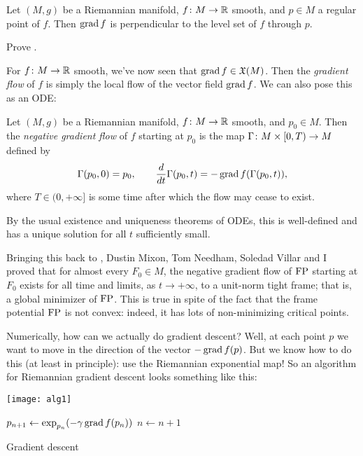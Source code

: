 \begin{proposition}\label{prop:gradient normal to level sets}
	Let $(M,g)$ be a Riemannian manifold, $f \colon\thinspace\! M \to \mathbb{R}$ smooth, and $p \in M$ a regular point of $f$. Then $\operatorname{grad} f$ is perpendicular to the level set of $f$ through $p$.
\end{proposition}

\begin{exercise}
	Prove .
\end{exercise}

For $f \colon\thinspace\! M \to \mathbb{R}$ smooth, we've now seen that $\operatorname{grad} f \in \mathfrak{X}(M)$. Then the \emph{gradient flow} of $f$ is simply the local flow of the vector field $\operatorname{grad} f$. We can also pose this as an ODE:

\begin{definition}\label{def:negative gradient flow}
	Let $(M,g)$ be a Riemannian manifold, $f \colon\thinspace\! M \to \mathbb{R}$ smooth, and $p_0 \in M$. Then the \emph{negative gradient flow} of $f$ starting at $p_0$ is the map $\Gamma \colon\thinspace\! M \times [0,T) \to M$ defined by
	\[
		\Gamma(p_0,0) = p_0, \qquad \frac{d}{dt}\Gamma(p_0,t) = -\operatorname{grad} f(\Gamma(p_0,t)),
	\]
	where $T \in (0,+\infty]$ is some time after which the flow may cease to exist.
\end{definition}
By the usual existence and uniqueness theorems of ODEs, this is well-defined and has a unique solution for all $t$ sufficiently small.

Bringing this back to , Dustin Mixon, Tom Needham, Soledad Villar and I~\cite{mixonThreeProofsBenedetto2023} proved that for almost every $F_0 \in M$, the negative gradient flow of $\operatorname{FP}$ starting at $F_0$ exists for all time and limits, as $t \to +\infty$, to a unit-norm tight frame; that is, a global minimizer of $\operatorname{FP}$. This is true in spite of the fact that the frame potential $\operatorname{FP}$ is not convex: indeed, it has lots of non-minimizing critical points.

Numerically, how can we actually do gradient descent? Well, at each point $p$ we want to move in the direction of the vector $-\operatorname{grad} f(p)$. But we know how to do this (at least in principle): use the Riemannian exponential map! So an algorithm for Riemannian gradient descent looks something like this:

\ifplastex
	\begin{center}
		\texttt{[image: alg1]}
	\end{center}
\else
	\begin{algorithm}[H]
	\begin{algorithmic}
	\Repeat
		\State $p_{n+1} \gets \exp_{p_n}(-\gamma \operatorname{grad} f(p_n))$
		\State $n \gets n+1$
	\EndProcedure
	\end{algorithmic}
	\caption{Gradient descent}
	\label{alg:gradient descent}
	\end{algorithm}
\fi

